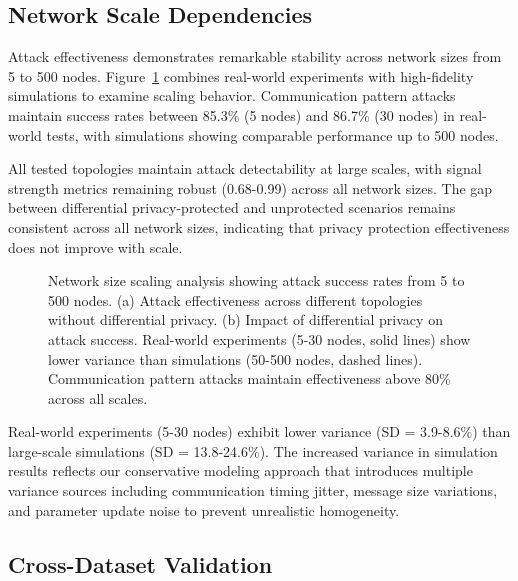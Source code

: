 \subsection{Network Scale Dependencies}

Attack effectiveness demonstrates remarkable stability across network sizes from 5 to 500 nodes. Figure~\ref{fig:network_scaling} combines real-world experiments with high-fidelity simulations to examine scaling behavior. Communication pattern attacks maintain success rates between 85.3\% (5 nodes) and 86.7\% (30 nodes) in real-world tests, with simulations showing comparable performance up to 500 nodes.

All tested topologies maintain attack detectability at large scales, with signal strength metrics remaining robust (0.68-0.99) across all network sizes. The gap between differential privacy-protected and unprotected scenarios remains consistent across all network sizes, indicating that privacy protection effectiveness does not improve with scale.

\begin{figure}[!t]
\centering
{}
\hfill
{}
\caption{Network size scaling analysis showing attack success rates from 5 to 500 nodes. (a) Attack effectiveness across different topologies without differential privacy. (b) Impact of differential privacy on attack success. Real-world experiments (5-30 nodes, solid lines) show lower variance than simulations (50-500 nodes, dashed lines). Communication pattern attacks maintain effectiveness above 80\% across all scales.}
\label{fig:network_scaling}
\end{figure}

Real-world experiments (5-30 nodes) exhibit lower variance (SD = 3.9-8.6\%) than large-scale simulations (SD = 13.8-24.6\%). The increased variance in simulation results reflects our conservative modeling approach that introduces multiple variance sources including communication timing jitter, message size variations, and parameter update noise to prevent unrealistic homogeneity.

\subsection{Cross-Dataset Validation}

